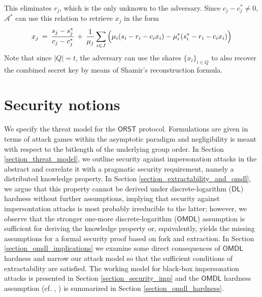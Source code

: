 \documentclass{iacrtrans}
\begin{document}
This eliminates $r_j$,
which is the only unknown to the adversary.
Since $c_j - c_j^* \neq 0$,
$\mathcal{A}^*$ can use this relation to retrieve
$x_j$ in the form
\vspace{5pt}
\begin{equation}\label{orst_key_recovery}
x_j
\hspace{2pt}
=
\hspace{2pt}
\frac{s_j - s_j^*}{c_j - c_j^*}
\hspace{2pt}
+
\hspace{2pt}
\frac{1}{\mu_j} \sum_{i \in J}
\hspace{0pt}
\Big(
	\mu_i (s_i - r_i - c_i x_i) -
	\mu_i^* (s_i^* - r_i - c_i x_i)
\Big)\hspace{1pt}
\vspace{5pt}
\end{equation}
\noindent
Note that since $|Q| = t$, the adversary can use
the shares $\{x_i\}_{i \in Q}$
to also recover the combined secret key
by means of Shamir's reconstruction formula.

\section{Security notions}\label{section_security_notions}

\noindent
We specify the threat model for the
$\mathsf{ORST}$ protocol.
Formulations are given in terms of attack games within the
asymptotic paradigm and negligibility
is meant with respect to the bitlength
of the underlying group order.
In Section \ref{section_threat_model}, we outline
security against impersonation attacks in the abstract
and correlate it with a pragmatic security requirement,
namely a distributed knowledge property.
In Section \ref{section_extractability_and_omdl},
we argue that this property cannot be derived
under discrete-logarithm ($\mathsf{DL}$) hardness
without further assumptions,
implying that security against impersontation
attacks is most probably irreducible
to the latter;
however, we observe that the stronger
one-more discrete-logarithm ($\mathsf{OMDL}$) assumption
is sufficient for deriving the knowledge property or,
equivalently, yields the missing assumptions
for a formal security proof based on fork and extraction.
In Section \ref{section_omdl_implications}
we examine some direct consequences of $\mathsf{OMDL}$ hardness
and narrow our attack model
so that the sufficient conditions of extractability are satisfied.
The working model for black-box impersonation attacks is presented
in Section \ref{section_security_imp}
and the $\mathsf{OMDL}$ hardness assumption
(cf. \cite{paper_bellare_palacio}, \cite{paper_bellare_omdl})
is summarized in Section
\ref{section_omdl_hardness}.
\end{document}
